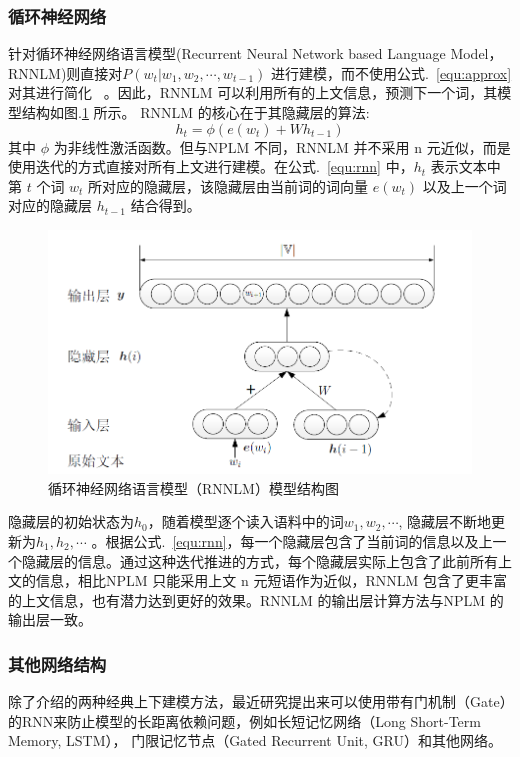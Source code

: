 \documentclass[twoside,UTF8,AutoFakeBold]{buaathesis}
\begin{document}
\subsubsection{循环神经网络}
针对循环神经网络语言模型(Recurrent Neural Network based Language Model，RNNLM)则直接对$P(w_t | w_1,w_2,\cdots,w_{t-1}) $ 进行建模，而不使用公式.~\ref{equ:approx} 对其进行简化~\cite{mikolov2012statistical,DBLP:conf/interspeech/MikolovKBCK10} 。因此，RNNLM 可以利用所有的上文信息，预测下一个词，其模型结构如图.\ref{fig:rnnlm} 所示。
RNNLM 的核心在于其隐藏层的算法:
\begin{equation}
\label{equ:rnn}
h_t =\phi(e(w_t) +Wh_{t -1})
\end{equation}
其中 $\phi$ 为非线性激活函数。但与NPLM 不同，RNNLM 并不采用 n 元近似，而是使用迭代的方式直接对所有上文进行建模。在公式.~\ref{equ:rnn} 中，$h_t$ 表示文本中第 $t$ 个词 $w_t$ 所对应的隐藏层，该隐藏层由当前词的词向量 $e(w_t)$ 以及上一个词对应的隐藏层 $h_{t -1}$ 结合得到。

\begin{figure}
  \centering
  \includegraphics[width=0.68\linewidth]{./figures/rnnlm.png}
  \caption{循环神经网络语言模型（RNNLM）模型结构图}\label{fig:rnnlm}
\end{figure}


隐藏层的初始状态为$h_0$，随着模型逐个读入语料中的词$w_1,w_2,\cdots$, 隐藏层不断地更新为$h_1,h_2,\cdots$ 。根据公式.~\ref{equ:rnn}，每一个隐藏层包含了当前词的信息以及上一个隐藏层的信息。通过这种迭代推进的方式，每个隐藏层实际上包含了此前所有上文的信息，相比NPLM 只能采用上文 n 元短语作为近似，RNNLM 包含了更丰富的上文信息，也有潜力达到更好的效果。RNNLM 的输出层计算方法与NPLM 的输出层一致。

\subsubsection{其他网络结构}
除了介绍的两种经典上下建模方法，最近研究提出来可以使用带有门机制（Gate）的RNN来防止模型的长距离依赖问题，例如长短记忆网络（Long Short-Term Memory, LSTM）， 门限记忆节点（Gated Recurrent Unit, GRU）和其他网络。
\end{document}
